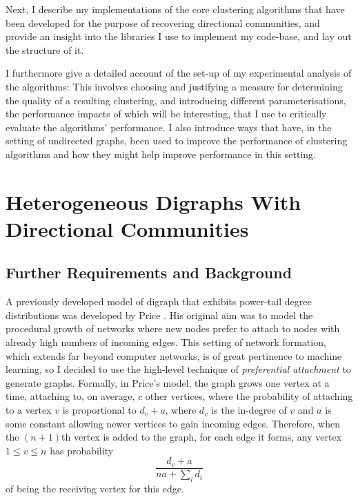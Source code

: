 Next, I describe my implementations of the core clustering algorithms that have 
been developed for the purpose of recovering directional communities, and provide an insight into 
the libraries I use to implement my code-base, and lay out the structure of it. 

I furthermore give a detailed account of the set-up of my experimental analysis of the algorithms:
This involves choosing and justifying a measure for determining the quality of a resulting 
clustering, and introducing different parameterisations, the performance impacts of which will be 
interesting, that I use to critically evaluate the algorithms' performance. I also introduce ways 
that have, in the setting of undirected graphs, been used to improve the performance of clustering 
algorithms and how they might help improve performance in this setting.

\section{Heterogeneous Digraphs With Directional Communities}
\subsection{Further Requirements and Background}


A previously developed model of digraph that exhibits power-tail degree distributions was 
developed by Price \cite{price}. His original aim was to model the procedural growth of networks where new 
nodes prefer to attach to nodes with already high numbers of incoming edges. This setting of 
network formation, which extends far beyond computer networks, is of great pertinence to 
machine learning, so I decided to use the high-level technique of \emph{preferential attachment} 
to generate graphs. Formally, in Price's model, the graph grows one vertex at a time, attaching to, 
on average, $c$ other vertices, where the probability of attaching to a vertex $v$ is proportional
to $d_v + a$, where $d_v$ is the in-degree of $v$ and $a$ is some constant allowing newer vertices 
to gain incoming edges. Therefore, when the $(n+1)$th vertex is added to the graph, for each edge 
it forms, any vertex $1 \leq v \leq n$ has probability
$$
	\frac{d_v + a}{na + \sum_i d_i}
$$
of being the receiving vertex for this edge.

